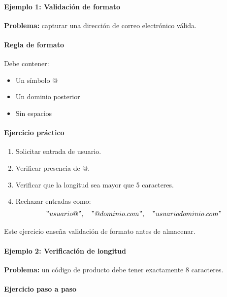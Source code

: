 \documentclass[12pt,twoside]{book}
\begin{document}
						\paragraph{Ejemplo 1: Validación de formato}
						
						\noindent
						\textbf{Problema:} capturar una dirección de correo electrónico válida.
						
						\paragraph{Regla de formato}
						Debe contener:
						\begin{itemize}
							\item Un símbolo @
							\item Un dominio posterior
							\item Sin espacios
						\end{itemize}
						
						\paragraph{Ejercicio práctico}
						
						\begin{enumerate}
							\item Solicitar entrada de usuario.
							\item Verificar presencia de @.
							\item Verificar que la longitud sea mayor que 5 caracteres.
							\item Rechazar entradas como:
							\[
							"usuario@",\quad "@dominio.com",\quad "usuario dominio.com"
							\]
						\end{enumerate}
						
						\noindent
						Este ejercicio enseña validación de formato antes de almacenar.
						
						\paragraph{Ejemplo 2: Verificación de longitud}
						
						\noindent
						\textbf{Problema:} un código de producto debe tener exactamente 8 caracteres.
						
						\paragraph{Ejercicio paso a paso}
						
\end{document}
